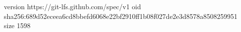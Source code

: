 version https://git-lfs.github.com/spec/v1
oid sha256:689d52eceea6cd8bbefd6068e22bf2910ff1b08f027de2e3d8578a8508259951
size 1598
